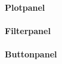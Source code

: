 \paragraph{Plotpanel} \label{par:plotpanel}


\paragraph{Filterpanel} \label{par:filterpanel}

\paragraph{Buttonpanel} \label{par:buttonpanel}

